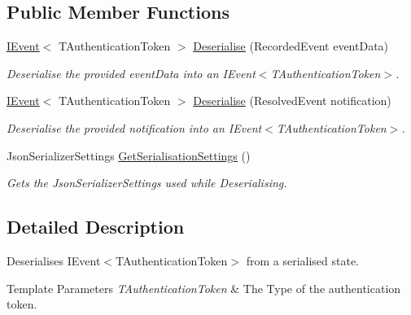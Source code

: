 \subsection*{Public Member Functions}
\begin{DoxyCompactItemize}
\item 
\hyperlink{interfaceCqrs_1_1Events_1_1IEvent}{I\+Event}$<$ T\+Authentication\+Token $>$ \hyperlink{interfaceCqrs_1_1EventStore_1_1IEventDeserialiser_ad84a4d975f6e2b5b1fef3fd23e738bfd_ad84a4d975f6e2b5b1fef3fd23e738bfd}{Deserialise} (Recorded\+Event event\+Data)
\begin{DoxyCompactList}\small\item\em Deserialise the provided {\itshape event\+Data}  into an I\+Event$<$\+T\+Authentication\+Token$>$. \end{DoxyCompactList}\item 
\hyperlink{interfaceCqrs_1_1Events_1_1IEvent}{I\+Event}$<$ T\+Authentication\+Token $>$ \hyperlink{interfaceCqrs_1_1EventStore_1_1IEventDeserialiser_a931d4a498b2213aac492bd35518a3286_a931d4a498b2213aac492bd35518a3286}{Deserialise} (Resolved\+Event notification)
\begin{DoxyCompactList}\small\item\em Deserialise the provided {\itshape notification}  into an I\+Event$<$\+T\+Authentication\+Token$>$. \end{DoxyCompactList}\item 
Json\+Serializer\+Settings \hyperlink{interfaceCqrs_1_1EventStore_1_1IEventDeserialiser_aa2859d10fd556b743679079ac15ffdde_aa2859d10fd556b743679079ac15ffdde}{Get\+Serialisation\+Settings} ()
\begin{DoxyCompactList}\small\item\em Gets the Json\+Serializer\+Settings used while Deserialising. \end{DoxyCompactList}\end{DoxyCompactItemize}


\subsection{Detailed Description}
Deserialises I\+Event$<$\+T\+Authentication\+Token$>$ from a serialised state. 


\begin{DoxyTemplParams}{Template Parameters}
{\em T\+Authentication\+Token} & The Type of the authentication token.\\
\hline
\end{DoxyTemplParams}


